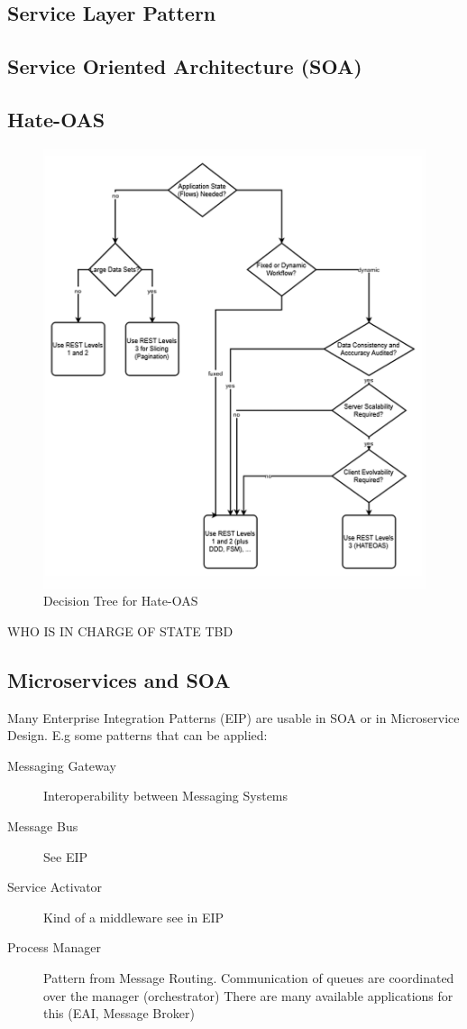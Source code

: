 \documentclass[../Main.tex]{subfiles}
\begin{document}
\subsection{Service Layer Pattern}
\subsection{Service Oriented Architecture (SOA)}

\subsection{Hate-OAS}
\begin{figure}[H]
    \centering
    \includegraphics[width=0.5\linewidth]{Images/hate-oas-dectree.png}
    \caption{Decision Tree for Hate-OAS}
\end{figure}

WHO IS IN CHARGE OF STATE TBD

\subsection{Microservices and SOA}

Many Enterprise Integration Patterns (EIP) are usable in SOA or in Microservice Design.
E.g some patterns that can be applied:
\begin{description}
    \item[Messaging Gateway] Interoperability between Messaging Systems
    \item[Message Bus] See EIP
    \item[Service Activator] Kind of a middleware see in EIP
    \item[Process Manager] Pattern from Message Routing. Communication of queues are coordinated over the manager (orchestrator)
    There are many available applications for this (EAI, Message Broker)
\end{description}
\end{document}
